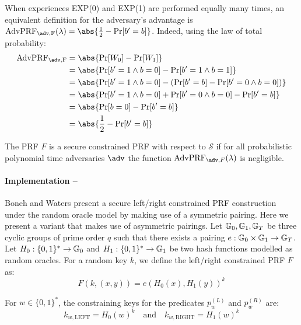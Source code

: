 		\noindent When experiences EXP(0) and EXP(1) are performed equally many times, an equivalent definition for the adversary's advantage is $\mathrm{AdvPRF_{\adv, F}}(\lambda) = \abs{\frac{1}{2} - \Pr[b' = b]}$. Indeed, using the law of total probability:
		\begin{align}
				\mathrm{AdvPRF_{\adv, F}} &= \abs{\mathrm{Pr}[W_0] - \mathrm{Pr}[W_1]} \\
				&= \abs{\Pr[b' = 1 \land b=0] - \Pr[b' = 1 \land b=1]} \\
				&= \abs{\Pr[b' = 1 \land b=0] - \left(\Pr[b' = b] - \Pr[b' = 0 \land b=0] \right)} \\
				&= \abs{\Pr[b' = 1 \land b=0] + \Pr[b' = 0 \land b=0] - \Pr[b' = b]}\\
				&= \abs{\Pr[b=0]- \Pr[b' = b]} \\
				&= \abs{\frac{1}{2} - \Pr[b' = b]}
			\end{align}
		
		\begin{definition}
		\label{def:lrPRFsec}
			The PRF $F$ is a secure constrained PRF with respect to $\mathcal{S}$ if for all probabilistic
polynomial time adversaries $\adv$ the function $\mathrm{AdvPRF}_{\adv,F}(\lambda)$ is negligible.
		\end{definition}


\paragraph{Implementation --} \label{leftright} Boneh and Waters \cite{LRPRF} present a secure left/right constrained PRF construction under the random oracle model by making use of a symmetric pairing. Here we present a variant that makes use of asymmetric pairings. Let $\mathbb{G}_0, \mathbb{G}_1, \mathbb{G}_T$ be three cyclic groups of prime order $q$ such that there exists a pairing $e : \mathbb{G}_0 \times \mathbb{G}_1 \rightarrow \mathbb{G}_T$. Let $H_0: \{0,1\}^* \rightarrow \mathbb{G}_0$ and $H_1: \{0,1\}^* \rightarrow \mathbb{G}_1$ be two hash functions modelled as random oracles. For a random key $k$, we define the left/right constrained PRF $F$ as:
\begin{equation}
	\label{eq:LRPRF}
	F(k, (x,y)) = e(H_0(x), H_1(y))^k
\end{equation}

For $w \in \{0,1\}^*$, the constraining keys for the predicates $p_w^{(L)}$ and  $p_w^{(R)}$ are:
\begin{equation}
\label{eq:constrkeys}
	k_{w,\mathrm{LEFT}} = H_0(w)^k \quad \mathrm{and} \quad k_{w,\mathrm{RIGHT}} = H_1(w)^k
\end{equation}

